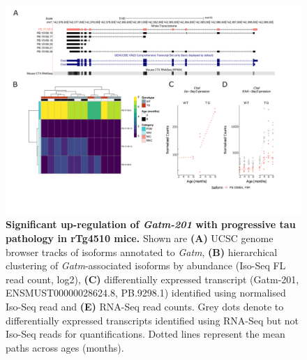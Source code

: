 \begin{landscape}
	\begin{figure}[!htp]
		\centering
		\includegraphics[page=3,trim={1.5cm 3.5cm 2cm 1cm}, scale = 0.85]{Figures/Ch5_DiffPlots_Landscape.pdf}
		\captionsetup{width=1.5\textwidth}
		\caption[Differential \textit{Gatm} transcript expression]%
		{\textbf{Significant up-regulation of \textit{Gatm-201} with progressive tau pathology in rTg4510 mice.} Shown are \textbf{(A)} UCSC genome browser tracks of isoforms annotated to \textit{Gatm}, \textbf{(B)} hierarchical clustering of \textit{Gatm}-associated isoforms by abundance (Iso-Seq FL read count, log2), \textbf{(C)} differentially expressed transcript (Gatm-201, ENSMUST00000028624.8, PB.9298.1) identified using normalised Iso-Seq read and \textbf{(E)} RNA-Seq read counts. Grey dots denote to differentially expressed transcripts identified using RNA-Seq but not Iso-Seq reads for quantifications. Dotted lines represent the mean paths across ages (months).}   
		\label{fig:Gatm}
	\end{figure}	
\end{landscape}

